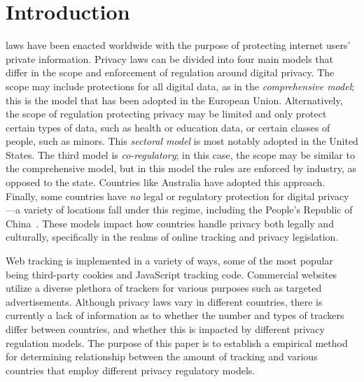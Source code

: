 \documentclass[conference]{IEEEtran}
\begin{document}
\section{Introduction}
% 
% 
% 
% 
laws have been enacted worldwide with the purpose of protecting internet users' private information. Privacy laws can be divided into four main models
 \cite{IAPPbook} that differ in the scope and enforcement of regulation around digital privacy. The scope may include protections for all digital data, as in the \emph{comprehensive model}; this is the model that has been adopted in the European Union. Alternatively, the scope of regulation protecting privacy may be limited and only protect certain types of data, such as health or education data, or certain classes of people, such as minors.  This \emph{sectoral model} is most notably adopted in the United States.  The third model is \emph{co-regulatory}; in this case, the scope may be similar to the comprehensive model, but in this model the rules are enforced by industry, as opposed to the state. Countries like Australia have adopted this approach. Finally, some countries have \emph{no} legal or regulatory protection for digital privacy---a variety of locations fall under this regime, including the People's Republic of China~\cite{solove2006model, IAPPbook}. These models impact how countries handle privacy both legally and culturally, specifically in the realms of online tracking and privacy legislation. 
 
Web tracking is implemented in a variety of ways, some of the most popular being third-party cookies and JavaScript tracking code. Commercial websites utilize a diverse plethora of trackers for various purposes such as targeted advertisements. Although privacy laws vary in different countries, there is currently a lack of information as to whether the number and types of trackers differ between countries, and whether this is impacted by different privacy regulation models. The purpose of this paper is to establish a empirical method for determining relationship between the amount of tracking and various countries that employ different privacy regulatory models.
\end{document}
